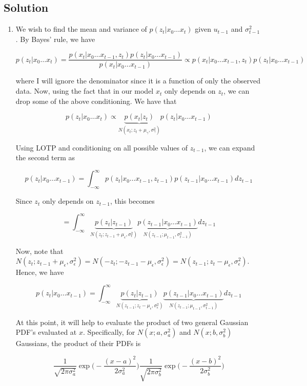 \documentclass[submit]{harvardml}
\begin{document}
\subsection*{Solution}

\begin{enumerate}

\item We wish to find the mean and variance of $p(z_t|x_0\dots x_t)$ given $u_{t-1}$ and $\sigma^2_{t-1}$. By Bayes' rule, we have 

$$p(z_t|x_0\dots x_t) = \frac{p(x_t|x_0\dots x_{t-1}, z_t)p(z_t|x_0\dots x_{t-1})}{p(x_t|x_0\dots x_{t-1})} \propto p(x_t|x_0\dots x_{t-1}, z_t)p(z_t|x_0\dots x_{t-1}) $$

where I will ignore the denominator since it is a function of only the observed data. Now, using the fact that in our model $x_t$ only depends on $z_t$, we can drop some of the above conditioning. We have that

$$p(z_t|x_0\dots x_t) \propto \underbrace{p(x_t|z_t)}_{N(x_t; z_t+\mu_\gamma, \sigma^2_\gamma)} p(z_t|x_0\dots x_{t-1}) $$

Using LOTP and conditioning on all possible values of $z_{t-1}$, we can expand the second term as

$$p(z_t|x_0\dots x_{t-1}) = \int_{-\infty}^\infty p(z_t|x_0\dots x_{t-1},z_{t-1})p(z_{t-1}| x_0\dots x_{t-1}) dz_{t-1}  $$

Since $z_t$ only depends on $z_{t-1}$, this becomes

$$ = \int_{-\infty}^\infty \underbrace{p(z_t|z_{t-1})}_{N(z_t; z_{t-1}+\mu_\epsilon, \sigma^2_\epsilon)} \underbrace{p(z_{t-1}| x_0\dots x_{t-1})}_{N(z_{t-1}; \mu_{t-1}, \sigma^2_{t-1})} dz_{t-1}  $$

Now, note that $N(z_t; z_{t-1}+\mu_\epsilon, \sigma^2_\epsilon) = N(-z_t; -z_{t-1}-\mu_\epsilon, \sigma^2_\epsilon) = N(z_{t-1}; z_t-\mu_\epsilon, \sigma^2_\epsilon)$. Hence, we have

$$p(z_t|x_0\dots x_{t-1}) =\int_{-\infty}^\infty \underbrace{p(z_t|z_{t-1})}_{N(z_{t-1}; z_t-\mu_\epsilon, \sigma^2_\epsilon)} \underbrace{p(z_{t-1}| x_0\dots x_{t-1})}_{N(z_{t-1}; \mu_{t-1}, \sigma^2_{t-1})} dz_{t-1}  $$

At this point, it will help to evaluate the product of two general Gaussian PDF's evaluated at $x$. Specifically, for $N(x;a,\sigma^2_a)$ and $N(x;b,\sigma^2_b)$ Gaussians, the product of their PDFs is

$$\frac{1}{\sqrt{2\pi\sigma^2_a}}\exp\big(-\frac{(x-a)^2}{2\sigma^2_a}\big)\frac{1}{\sqrt{2\pi\sigma^2_b}}\exp\big(-\frac{(x-b)^2}{2\sigma^2_b}\big) $$


\end{enumerate}
\end{document}

